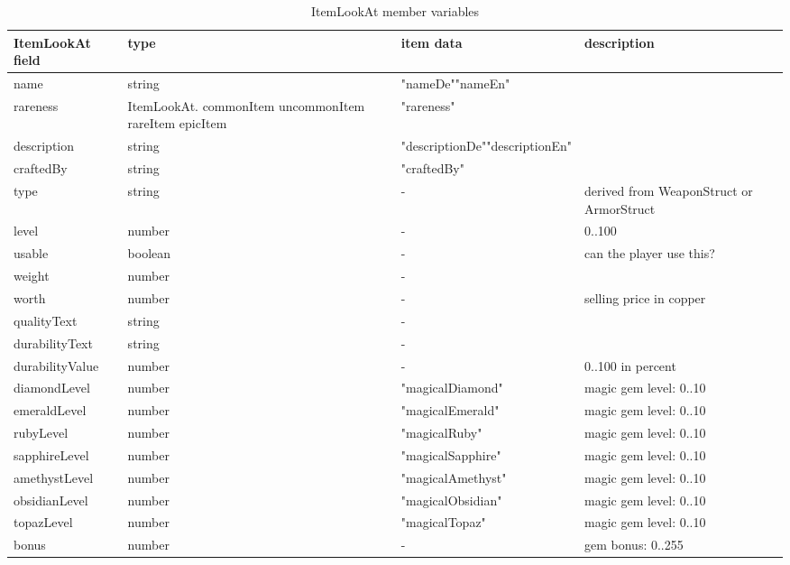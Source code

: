 \documentclass[a4paper,10pt,makeidx]{scrreprt}
\begin{document}
\begin{table}
\begin{tabular}{l|p{3.8cm}|p{3cm}|p{3.5cm}}
    ItemLookAt field & type & item data & description\\ \hline
    name & string & "nameDe"\newline"nameEn"\\
    rareness & ItemLookAt.\newline
        \hspace*{5mm}commonItem\newline
        \hspace*{5mm}uncommonItem\newline
        \hspace*{5mm}rareItem\newline
        \hspace*{5mm}epicItem & "rareness"\\
    description & string & "descriptionDe"\newline"descriptionEn"\\
    craftedBy & string & "craftedBy"\\
    type & string & - & derived from WeaponStruct or ArmorStruct\\
    level & number & - & 0..100\\
    usable & boolean & - & can the player use this?\\
    weight & number & -\\
    worth & number & - & selling price in copper\\
    qualityText & string & -\\
    durabilityText & string & -\\
    durabilityValue & number & - & 0..100 in percent\\
    diamondLevel & number & "magicalDiamond" & magic gem level: 0..10\\
    emeraldLevel & number & "magicalEmerald" & magic gem level: 0..10\\
    rubyLevel & number & "magicalRuby" & magic gem level: 0..10\\
    sapphireLevel & number & "magicalSapphire" & magic gem level: 0..10\\
    amethystLevel & number & "magicalAmethyst" & magic gem level: 0..10\\
    obsidianLevel & number & "magicalObsidian" & magic gem level: 0..10\\
    topazLevel & number & "magicalTopaz" & magic gem level: 0..10\\
    bonus & number & - & gem bonus: 0..255\\
\end{tabular}
\caption{ItemLookAt member variables}\label{ItemLookAt}
\end{table}
\end{document}
